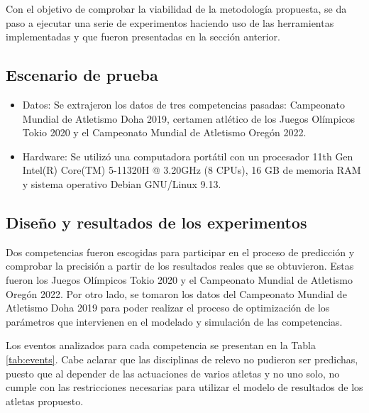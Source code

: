 Con el objetivo de comprobar la viabilidad de la metodología propuesta, se da paso a ejecutar una serie de experimentos haciendo uso de las herramientas implementadas y que fueron presentadas en la sección anterior.

\subsection*{Escenario de prueba}

\begin{itemize}
    \item Datos: Se extrajeron los datos de tres competencias pasadas: Campeonato Mundial de Atletismo Doha 2019, certamen atlético de los Juegos Olímpicos Tokio 2020 y el Campeonato Mundial de Atletismo Oregón 2022.
    \item Hardware: Se utilizó una computadora portátil con un procesador 11th Gen Intel(R) Core(TM) 5-11320H @ 3.20GHz (8 CPUs), 16 GB de memoria RAM y sistema operativo Debian GNU/Linux 9.13.
\end{itemize}

\subsection*{Diseño y resultados de los experimentos}

Dos competencias fueron escogidas para participar en el proceso de predicción y comprobar la precisión a partir de los resultados reales que se obtuvieron. Estas fueron los Juegos Olímpicos Tokio 2020 y el Campeonato Mundial de Atletismo Oregón 2022. Por otro lado, se tomaron los datos del Campeonato Mundial de Atletismo Doha 2019 para poder realizar el proceso de optimización de los parámetros que intervienen en el modelado y simulación de las competencias.

Los eventos analizados para cada competencia se presentan en la Tabla \ref{tab:events}. Cabe aclarar que las disciplinas de relevo no pudieron ser predichas, puesto que al depender de las actuaciones de varios atletas y no uno solo, no cumple con las restricciones necesarias para utilizar el modelo de resultados de los atletas propuesto.

